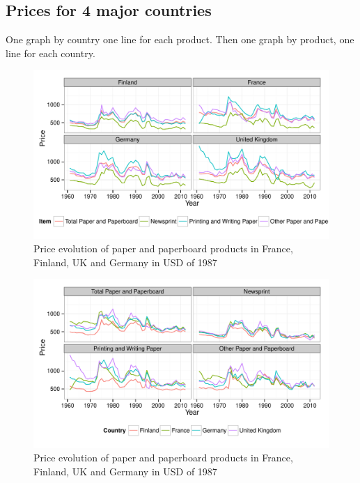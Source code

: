 \documentclass{scrartcl}\usepackage{graphicx, color}
\newenvironment{knitrout}{}{} %
\begin{document}
\subsection{Prices for 4 major countries}
One graph by country one line for each product. Then one graph by product, one line for each country.
\begin{knitrout}
\color{fgcolor}\begin{figure}[h]


{\centering \includegraphics[width=1\linewidth]{figure/Price4MajorCountries1} 

}

\caption[Price evolution of paper and paperboard products in France, Finland, UK and Germany in USD of 1987]{Price evolution of paper and paperboard products in France, Finland, UK and Germany in USD of 1987\label{fig:Price4MajorCountries1}}
\end{figure}

\begin{figure}[h]


{\centering \includegraphics[width=1\linewidth]{figure/Price4MajorCountries2} 

}

\caption[Price evolution of paper and paperboard products in France, Finland, UK and Germany in USD of 1987]{Price evolution of paper and paperboard products in France, Finland, UK and Germany in USD of 1987\label{fig:Price4MajorCountries2}}
\end{figure}


\end{knitrout}
\end{document}
